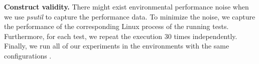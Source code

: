 
\noindent \textbf{Construct validity.} %
There might exist environmental performance noise when we use \emph{psutil} to capture the performance data. To minimize the noise, we capture the performance of the corresponding Linux process of the running tests. Furthermore, for each test, we repeat the execution 30 times independently. %
Finally, we run all of our experiments in the environments with the same configurations .